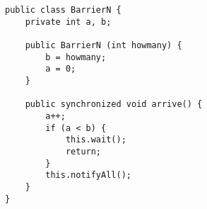 \section{}

\begin{lstlisting}
public class BarrierN {
    private int a, b;

    public BarrierN (int howmany) {
        b = howmany;
        a = 0;
    }

    public synchronized void arrive() {
        a++;
        if (a < b) {
            this.wait();
            return;
        }
        this.notifyAll();
    }
}
\end{lstlisting}